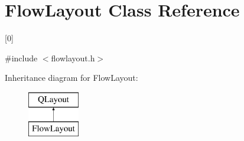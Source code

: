 \hypertarget{class_flow_layout}{}\section{Flow\+Layout Class Reference}
\label{class_flow_layout}


\mbox{[}0\mbox{]}  




{\ttfamily \#include $<$flowlayout.\+h$>$}

Inheritance diagram for Flow\+Layout\+:\begin{figure}[H]
\begin{center}
\leavevmode
\includegraphics[height=2.000000cm]{class_flow_layout}
\end{center}
\end{figure}
